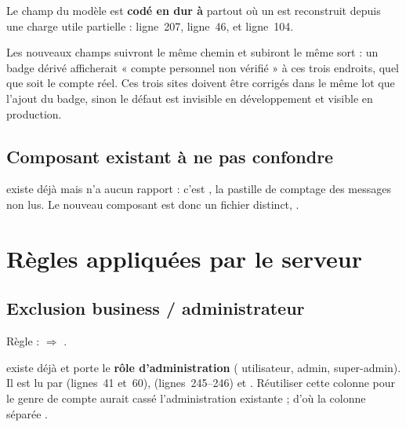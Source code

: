 \begin{constat}
Le champ  du modèle  est \textbf{codé en dur à } partout
où un  est reconstruit depuis une charge utile partielle :
 ligne~207,
 ligne~46, et
 ligne~104.
\end{constat}

Les nouveaux champs suivront le même chemin et subiront le même sort : un badge dérivé
afficherait « compte personnel non vérifié » à ces trois endroits, quel que soit le compte
réel. Ces trois sites doivent être corrigés dans le même lot que l'ajout du badge, sinon le
défaut est invisible en développement et visible en production.

\section{Composant existant à ne pas confondre}

 existe déjà mais n'a aucun rapport : c'est
, la pastille de comptage des messages non lus. Le nouveau composant est
donc un fichier distinct, .

\chapter{Règles appliquées par le serveur}

\section{Exclusion business / administrateur}

Règle :  $\Rightarrow$ .

\begin{note}
 existe déjà et porte le \textbf{rôle d'administration}
( utilisateur,  admin,  super-admin). Il est lu par
 (lignes~41 et~60),
 (lignes~245--246) et
. Réutiliser cette colonne pour le genre de compte aurait
cassé l'administration existante ; d'où la colonne séparée .
\end{note}

